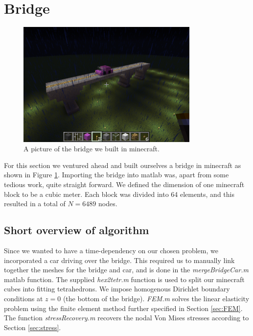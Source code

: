 \section{Bridge}

\begin{figure}
\center
\includegraphics[trim=0cm 5cm 7cm 7cm, clip=true, width=0.8\textwidth]{pic_bridge}
\caption{A picture of the bridge we built in minecraft.}
\label{fig:picBridge}
\end{figure}


For this section we ventured ahead and built ourselves a bridge in minecraft as shown in Figure \ref{fig:picBridge}. Importing the bridge into matlab was, apart from some tedious work, quite straight forward. We defined the dimension of one minecraft block to be a cubic meter. Each block was divided into 64 elements, and this resulted in a total of $N = 6489$ nodes.


\subsection{Short overview of algorithm}
Since we wanted to have a time-dependency on our chosen problem, we incorporated a car driving over the bridge. This required us to manually link together the meshes for the bridge and car, and is done in the \textit{mergeBridgeCar.m} matlab function. The supplied \textit{hex2tetr.m} function is used to split our minecraft cubes into fitting tetrahedrons. We impose homogenous Dirichlet boundary conditions at $z = 0$ (the bottom of the bridge). \textit{FEM.m} solves the linear elasticity problem using the finite element method further specified in Section \ref{sec:FEM}. The function \textit{stressRecovery.m} recovers the nodal Von Mises stresses according to Section \ref{sec:stress}.

